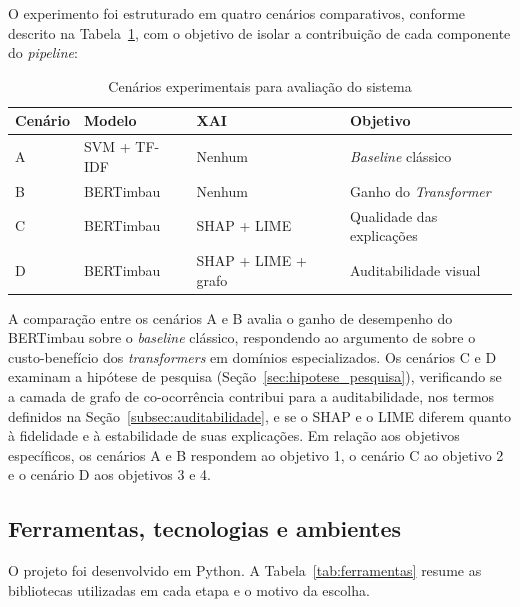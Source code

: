 \documentclass[
    12pt,                %
    openright,           %
    oneside,             %
    a4paper,             %
    english,             %
    brazil               %
]{abntex2}
\let\legendoriginal\legend
\renewcommand{\legend}[1]{\legendoriginal{\small #1}}
\begin{document}
O experimento foi estruturado em quatro cenários comparativos, conforme descrito na Tabela~\ref{tab:cenarios}, com o objetivo de isolar a contribuição de cada componente do \textit{pipeline}:

\begin{table}[H]
\centering
\caption{Cenários experimentais para avaliação do sistema}
\label{tab:cenarios}
\begin{tabular}{p{1.5cm} p{3.5cm} p{3.5cm} p{4.5cm}}
\toprule
\textbf{Cenário} & \textbf{Modelo} & \textbf{XAI} & \textbf{Objetivo} \\
\midrule
A & SVM + TF-IDF & Nenhum & \textit{Baseline} clássico \\
B & BERTimbau & Nenhum & Ganho do \textit{Transformer} \\
C & BERTimbau & SHAP + LIME & Qualidade das explicações \\
D & BERTimbau & SHAP + LIME + grafo & Auditabilidade visual \\
\bottomrule
\end{tabular}
\legend{Fonte: Elaborado pelos autores.}
\end{table}

A comparação entre os cenários A e B avalia o ganho de desempenho do BERTimbau sobre o \textit{baseline} clássico, respondendo ao argumento de 
 sobre o custo-benefício dos \textit{transformers} em domínios especializados. Os cenários C e D examinam a hipótese de pesquisa (Seção~\ref{sec:hipotese_pesquisa}), verificando se a camada de grafo de co-ocorrência contribui para a auditabilidade, nos termos definidos na Seção~\ref{subsec:auditabilidade}, e se o SHAP e o LIME diferem quanto à fidelidade e à estabilidade de suas explicações. Em relação aos objetivos específicos, os cenários A e B respondem ao objetivo 1, o cenário C ao objetivo 2 e o cenário D aos objetivos 3 e 4.

\subsection{Ferramentas, tecnologias e ambientes}
\label{sec:ferramentas}

O projeto foi desenvolvido em Python. A Tabela~\ref{tab:ferramentas} resume as bibliotecas utilizadas em cada etapa e o motivo da escolha.
\end{document}
